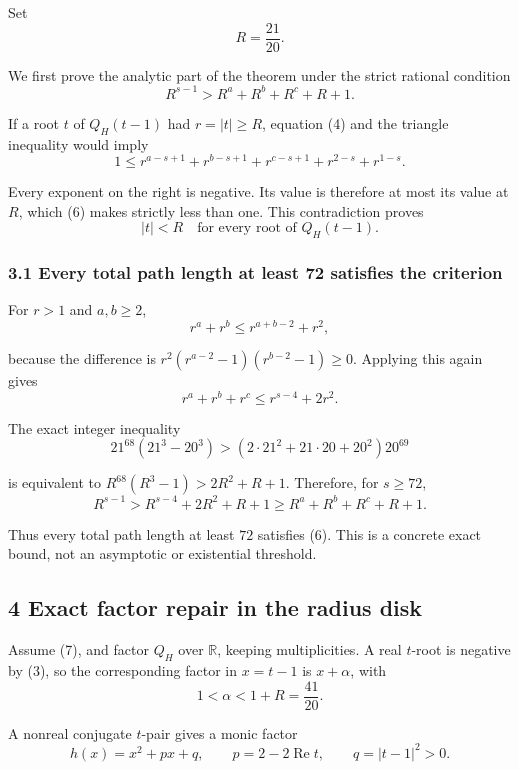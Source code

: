 \documentclass[
  11pt,
  a4paper,
]{article}
\begin{document}
Set
\nopagebreak
\[
R=\frac{21}{20}.
\]

We first prove the analytic part of the theorem under the strict
rational condition
\nopagebreak
\[
R^{s-1}>R^a+R^b+R^c+R+1.\tag{6}
\]

If a root \(t\) of \(Q_H(t-1)\) had \(r=|t|\geq R\), equation (4) and
the triangle inequality would imply
\nopagebreak
\[
1\leq r^{a-s+1}+r^{b-s+1}+r^{c-s+1}
+r^{2-s}+r^{1-s}.
\]

Every exponent on the right is negative. Its value is therefore at most
its value at \(R\), which (6) makes strictly less than one. This
contradiction proves
\nopagebreak
\[
|t|<R\quad\text{for every root of }Q_H(t-1).\tag{7}
\]

\subsubsection{3.1 Every total path length at least 72 satisfies the
criterion}\label{every-total-path-length-at-least-72-satisfies-the-criterion}

For \(r>1\) and \(a,b\geq2\),
\nopagebreak
\[
r^a+r^b\leq r^{a+b-2}+r^2,
\]

because the difference is \(r^2(r^{a-2}-1)(r^{b-2}-1)\geq0\). Applying
this again gives
\nopagebreak
\[
r^a+r^b+r^c\leq r^{s-4}+2r^2.
\]

The exact integer inequality
\nopagebreak
\[
21^{68}(21^3-20^3)
>(2\cdot21^2+21\cdot20+20^2)20^{69}\tag{8}
\]

is equivalent to \(R^{68}(R^3-1)>2R^2+R+1\). Therefore, for \(s\geq72\),
\nopagebreak
\[
R^{s-1}>R^{s-4}+2R^2+R+1
\geq R^a+R^b+R^c+R+1.
\]

Thus every total path length at least \(72\) satisfies (6). This is a
concrete exact bound, not an asymptotic or existential threshold.

\subsection{4 Exact factor repair in the radius
disk}\label{exact-factor-repair-in-the-radius-disk}

Assume (7), and factor \(Q_H\) over \(\mathbb R\), keeping
multiplicities. A real \(t\)-root is negative by (3), so the
corresponding factor in \(x=t-1\) is \(x+\alpha\), with
\nopagebreak
\[
1<\alpha<1+R=\frac{41}{20}.
\]

A nonreal conjugate \(t\)-pair gives a monic factor
\nopagebreak
\[
h(x)=x^2+px+q,\qquad
p=2-2\operatorname{Re}t,\qquad q=|t-1|^2>0.
\]
\end{document}
